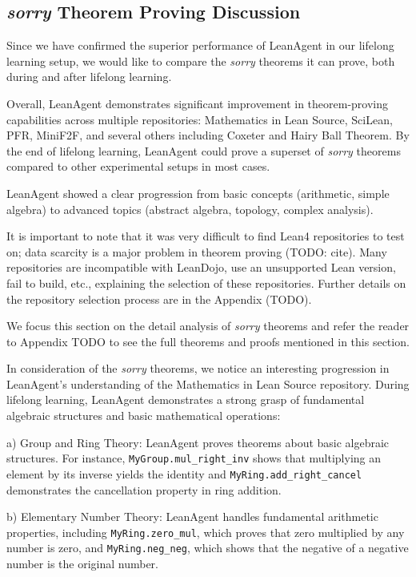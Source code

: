 \documentclass{article} %
\begin{document}
\subsection{\textit{sorry} Theorem Proving Discussion}

Since we have confirmed the superior performance of LeanAgent in our lifelong learning setup, we would like to compare the \textit{sorry} theorems it can prove, both during and after lifelong learning.

Overall, LeanAgent demonstrates significant improvement in theorem-proving capabilities across multiple repositories: Mathematics in Lean Source, SciLean, PFR, MiniF2F, and several others including Coxeter and Hairy Ball Theorem. By the end of lifelong learning, LeanAgent could prove a superset of \textit{sorry} theorems compared to other experimental setups in most cases.

LeanAgent showed a clear progression from basic concepts (arithmetic, simple algebra) to advanced topics (abstract algebra, topology, complex analysis).

It is important to note that it was very difficult to find Lean4 repositories to test on; data scarcity is a major problem in theorem proving (TODO: cite). Many repositories are incompatible with LeanDojo, use an unsupported Lean version, fail to build, etc., explaining the selection of these repositories. Further details on the repository selection process are in the Appendix (TODO).


We focus this section on the detail analysis of \textit{sorry} theorems and refer the reader to Appendix TODO to see the full theorems and proofs mentioned in this section.

In consideration of the \textit{sorry} theorems, we notice an interesting progression in LeanAgent's understanding of the Mathematics in Lean Source repository. During lifelong learning, LeanAgent demonstrates a strong grasp of fundamental algebraic structures and basic mathematical operations:

a) Group and Ring Theory:
LeanAgent proves theorems about basic algebraic structures. For instance, \texttt{MyGroup.mul\_right\_inv} shows that multiplying an element by its inverse yields the identity and \texttt{MyRing.add\_right\_cancel} demonstrates the cancellation property in ring addition.

b) Elementary Number Theory:
LeanAgent handles fundamental arithmetic properties, including \texttt{MyRing.zero\_mul}, which proves that zero multiplied by any number is zero, and \texttt{MyRing.neg\_neg}, which shows that the negative of a negative number is the original number.
\end{document}
